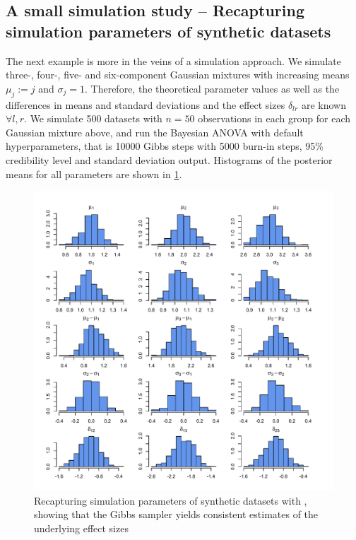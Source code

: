 \subsection{A small simulation study -- Recapturing simulation parameters of synthetic datasets}
The next example is more in the veins of a simulation approach. We simulate three-, four-, five- and six-component Gaussian mixtures with increasing means $\mu_j:=j$ and $\sigma_j=1$. Therefore, the theoretical parameter values as well as the differences in means and standard deviations and the effect sizes $\delta_{lr}$ are known $\forall l,r$.
We simulate 500 datasets with $n=50$ observations in each group for each Gaussian mixture above, and run the Bayesian ANOVA with default hyperparameters, that is 10000 Gibbs steps with 5000 burn-in steps, 95\% credibility level and standard deviation output. Histograms of the posterior means for all parameters are shown in  \ref{fig:sim}.

\begin{figure}[h!]
\centering
\includegraphics[width=1\textwidth]{sim}
\caption{Recapturing simulation parameters of synthetic datasets with , showing that the Gibbs sampler yields consistent estimates of the underlying effect sizes}
\label{fig:sim}
\end{figure}

